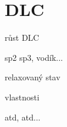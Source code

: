 \chapter{DLC}

růst DLC

sp2 sp3, vodík...

relaxovaný stav

vlastnosti

atd, atd...

\cleardoublepage
